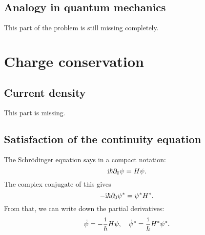 \documentclass[11pt, english, fleqn, DIV=15, headinclude, BCOR=1cm]{scrartcl}
\begin{document}
\subsection{Analogy in quantum mechanics}

\begin{note}
    This part of the problem is still missing completely.
\end{note}

\section{Charge conservation} %

\newcommand\cc{\mathop{}\text{c.c.}}
\newcommand\hc{\mathop{}\text{h.c.}}

\subsection{Current density}

\begin{note}
    This part is missing.
\end{note}

\subsection{Satisfaction of the continuity equation}

The Schrödinger equation says in a compact notation:
\[
    \mathrm i \hbar \partial_0 \psi = H \psi.
\]
The complex conjugate of this gives
\[
    - \mathrm i \hbar \partial_0 \psi^* = \psi^* H^*.
\]
From that, we can write down the partial derivatives:
\[
    \dot \psi = - \frac{\mathrm i}{\hbar} H \psi
    ,\quad
    \dot \psi^* = \frac{\mathrm i}{\hbar} H^* \psi^*.
\]
\end{document}
